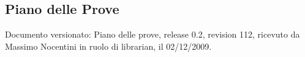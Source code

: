 \subsection{Piano delle Prove}
Documento versionato: Piano delle prove, release 0.2, revision 112, ricevuto da
Massimo Nocentini in ruolo di librarian, il 02/12/2009.